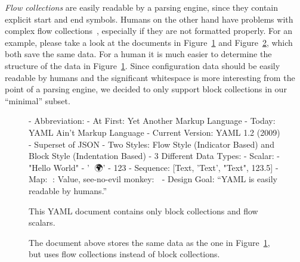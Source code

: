 \emph{Flow collections} are easily readable by a parsing engine, since they contain explicit start and end symbols. Humans on the other hand have problems with complex flow collections~\cite{connor2018flowstyle}, especially if they are not formatted properly. For an example, please take a look at the  documents in Figure~\ref{fig:block_collection} and Figure~\ref{fig:flow_collection}, which both save the same data. For a human it is much easier to determine the structure of the data in Figure~\ref{fig:block_collection}. Since configuration data should be easily readable by humans and the significant whitespace is more interesting from the point of a parsing engine, we decided to only support block collections in our “minimal”  subset.

\begin{figure}
  \begin{yamlcode}
    - Abbreviation:
       - At First: Yet Another Markup Language
       - Today: YAML Ain’t Markup Language
    - Current Version: YAML 1.2 (2009)
    - Superset of JSON
    - Two Styles: Flow Style (Indicator Based) and
                  Block Style (Indentation Based)
    - 3 Different Data Types:
      - Scalar:
        - "Hello World"
        - '👋 🌍'
        - 123
      - Sequence: [Text, 'Text', "Text", 123.5]
      - Map: {🔑: Value, see-no-evil monkey: 🙈}
    - Design Goal: “YAML is easily readable by humans.”
  \end{yamlcode}
  \caption{This YAML document contains only block collections and flow scalars.}
  \label{fig:block_collection}
\end{figure}

\begin{figure}
\begin{yamlcode}
\end{yamlcode}
  \caption{The  document above stores the same data as the one in Figure~\ref{fig:block_collection}, but uses flow collections instead of block collections.}
  \label{fig:flow_collection}
\end{figure}

